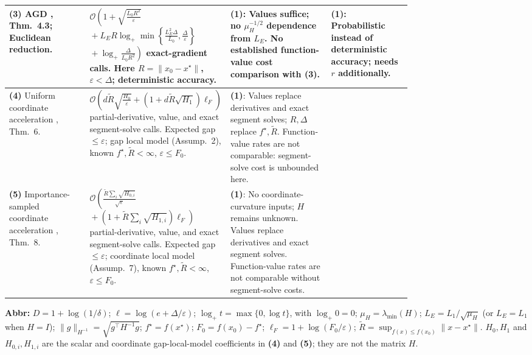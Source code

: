 \begin{table}[tp]
\begin{threeparttable}
\begin{tabularx}{\linewidth}{@{}>{\raggedright\arraybackslash}p{0.20\linewidth}>{\raggedright\arraybackslash}p{0.32\linewidth}>{\raggedright\arraybackslash}p{0.25\linewidth}>{\raggedright\arraybackslash}X@{}}
\midrule
\textbf{(3)} AGD \citep{cgsTyurin2026v2}, Thm.~4.3; Euclidean reduction.
& $\mathcal{O}\!\left(1+\sqrt{\frac{L_0R^2}{\varepsilon}}\right.$\newline
$\left.{}+L_E R\log_+\min\!\left\{\frac{L_E^2\Delta}{L_0},\frac{\Delta}{\varepsilon}\right\}\right.$\newline
$\left.{}+\log_+\frac{\Delta}{L_0R^2}\right)$ exact-gradient calls. Here $R=\|x_0-x^\star\|$, $\varepsilon<\Delta$; deterministic accuracy.
& \textbf{(1)}: Values suffice; no $\mu_H^{-1/2}$ dependence from $L_E$. No established function-value cost comparison with \textbf{(3)}.
& \textbf{(1)}: Probabilistic instead of deterministic accuracy; needs $r$ additionally. \\
\midrule
\textbf{(4)} Uniform coordinate acceleration \citep{zmgsLobanov2026v1}, Thm.~6.
& $\mathcal{O}\!\left(d\widetilde R\sqrt{\frac{H_0}{\varepsilon}} +(1+d\widetilde R\sqrt{H_1})\ell_F\right)$ partial-derivative, value, and exact segment-solve calls. Expected gap $\le\varepsilon$; gap local model (Assump.~2), known $f^\star,\widetilde R<\infty$, $\varepsilon\le F_0$.
& \textbf{(1)}: Values replace derivatives and exact segment solves; $R,\Delta$ replace $f^\star,\widetilde R$. Function-value rates are not comparable: segment-solve cost is unbounded here.
& \\
\midrule
\textbf{(5)} Importance-sampled coordinate acceleration \citep{zmgsLobanov2026v1}, Thm.~8.
& $\mathcal{O}\!\left(\frac{\widetilde R\sum_i\sqrt{H_{0,i}}}{\sqrt{\varepsilon}}\right.$\newline
$\left.{}+(1+\widetilde R\sum_i\sqrt{H_{1,i}})\ell_F\right)$ partial-derivative, value, and exact segment-solve calls. Expected gap $\le\varepsilon$; coordinate local model (Assump.~7), known $f^\star,\widetilde R<\infty$, $\varepsilon\le F_0$.
& \textbf{(1)}: No coordinate-curvature inputs; $H$ remains unknown. Values replace derivatives and exact segment solves. Function-value rates are not comparable without segment-solve costs.
& \\
\bottomrule
\end{tabularx}
\begin{tablenotes}[flushleft]\footnotesize
\item[] \textbf{Abbr:} $D=1+\log(1/\delta)$; $\ell=\log(e+\Delta/\varepsilon)$; $\log_+t=\max\{0,\log t\}$, with $\log_+0=0$; $\mu_H=\lambda_{\min}(H)$; $L_E=L_1/\sqrt{\mu_H}$ (or $L_E=L_1$ when $H=I$); $\|g\|_{H^{-1}}=\sqrt{g^\top H^{-1}g}$; $f^\star=f(x^\star)$; $F_0=f(x_0)-f^\star$; $\ell_F=1+\log(F_0/\varepsilon)$; $\widetilde R=\sup_{f(x)\le f(x_0)}\|x-x^\star\|$. $H_0,H_1$ and $H_{0,i},H_{1,i}$ are the scalar and coordinate gap-local-model coefficients in \textbf{(4)} and \textbf{(5)}; they are not the matrix $H$.
\end{tablenotes}
\end{threeparttable}
\end{table}
\clearpage
